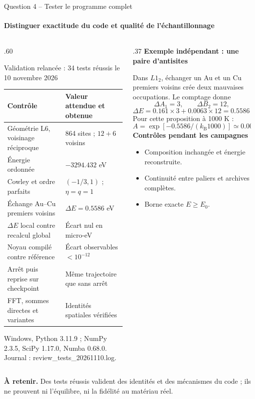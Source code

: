 \documentclass[aspectratio=169,10pt]{beamer}
\newcommand{\kb}{k_{\mathrm B}}
\newcommand{\takeaway}[1]{\par\smallskip\colorbox{pale}{\parbox{\dimexpr\linewidth-2\fboxsep\relax}{\strut\textbf{À retenir.} #1\strut}}}
\newcommand{\src}[1]{{\fontsize{6.5}{7.5}\selectfont\color{teal}#1\par}}
\newcommand{\tightlist}{\setlength{\itemsep}{2pt}\setlength{\parskip}{0pt}}
\begin{document}
\begin{frame}[t]{Question 4 -- Tester le programme complet}
\framesubtitle{Distinguer exactitude du code et qualité de l'échantillonnage}
\begin{columns}[T,onlytextwidth]
\begin{column}{.60\textwidth}
\begin{block}{Validation relancée : 34 tests réussis le 10 novembre 2026}
\begin{tabular}{p{.47\linewidth}p{.43\linewidth}}\toprule
Contrôle & Valeur attendue et obtenue\\\midrule
Géométrie L6, voisinage réciproque & 864 sites ; $12+6$ voisins\\
Énergie ordonnée & $-3294.432$ eV\\
Cowley et ordre parfaits & $(-1/3,1)$ ; $\eta=q=1$\\
Échange Au--Cu premiers voisins & $\Delta E=0.5586$ eV\\
$\Delta E$ local contre recalcul global & Écart nul en micro-eV\\
Noyau compilé contre référence & Écart observables $<10^{-12}$\\
Arrêt puis reprise sur checkpoint & Même trajectoire que sans arrêt\\
FFT, sommes directes et variantes & Identités spatiales vérifiées\\\bottomrule
\end{tabular}
\end{block}
\src{Windows, Python 3.11.9 ; NumPy 2.3.5, SciPy 1.17.0, Numba 0.68.0. Journal : review\_tests\_20261110.log.}
\end{column}
\begin{column}{.37\textwidth}
\textbf{Exemple indépendant : une paire d'antisites}

Dans $L1_2$, échanger un Au et un Cu premiers voisins crée deux mauvaises occupations.
Le comptage donne
\[
\Delta A_1=3,\qquad \Delta B_2=12,
\]
\[
\Delta E=0.161\times3+0.0063\times12
=0.5586\ \mathrm{eV}.
\]
Pour cette proposition à 1000 K :
\[
A=\exp[-0.5586/(\kb1000)]\simeq0.00153.
\]
\textbf{Contrôles pendant les campagnes}
\begin{itemize}\tightlist
\item Composition inchangée et énergie reconstruite.
\item Continuité entre paliers et archives complètes.
\item Borne exacte $E\geq E_0$.
\end{itemize}
\end{column}
\end{columns}
\takeaway{Des tests réussis valident des identités et des mécanismes du code ; ils ne prouvent ni l'équilibre, ni la fidélité au matériau réel.}
\end{frame}
\end{document}
